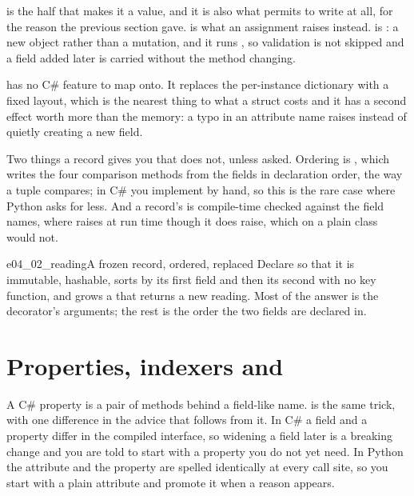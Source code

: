 

\noindent
{} is the half that makes it a value, and it is also what
permits  to write  at all, for the
reason the previous section gave.
 is what an assignment raises instead.  is : a new object rather than a
mutation, and it runs , so validation is not skipped and
a field added later is carried without the method changing.

 has no C\# feature to map onto. It replaces the
per-instance dictionary with a fixed layout, which is the nearest thing to
what a struct costs \dash{} and it has a second effect worth more than the
memory: a typo in an attribute name raises  instead of
quietly creating a new field.

\begin{csbox}
Two things a record gives you that  does not, unless
asked. Ordering is , which writes the four comparison
methods from the fields in declaration order, the way a tuple compares; in
C\# you implement  by hand, so this is the rare case
where Python asks for less. And a record's  is compile-time
checked against the field names, where  raises at
run time \dash{} though it does raise, which  on a plain
class would not.
\end{csbox}

\begin{exercise}{e04_02_reading}{A frozen record, ordered, replaced}
Declare  so that it is immutable, hashable, sorts by its
first field and then its second with no key function, and grows a
 that returns a new reading. Most of the answer is the
decorator's arguments; the rest is the order the two fields are declared
in.
\end{exercise}

\section{Properties, indexers and \texorpdfstring{}{IEnumerable}}
\label{sec:ch04-properties}

A C\# property is a pair of methods behind a field-like name.
 is the same trick, with one difference in the advice that
follows from it. In C\# a field and a property differ in the compiled
interface, so widening a field later is a breaking change and you are told
to start with a property you do not yet need. In Python the attribute and
the property are spelled identically at every call site, so you start with
a plain attribute and promote it when a reason appears.

